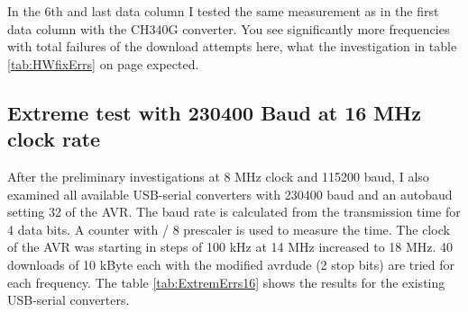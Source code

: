 In the 6th and last data column I tested the same measurement as in the first data column with the CH340G converter.
You see significantly more frequencies with total failures of the download attempts here,
what the investigation in table \ref{tab:HWfixErrs} on page \pageref{tab:HWfixErrs} expected.

\subsection{Extreme test with 230400 Baud at 16 MHz clock rate}

After the preliminary investigations at 8 MHz clock and 115200 baud, I also examined all
available USB-serial converters with 230400 baud and an autobaud setting 32 of the AVR.
The baud rate is calculated from the transmission time for 4 data bits.
A counter with / 8 prescaler is used to measure the time.
The clock of the AVR was starting in steps of 100 kHz
at 14 MHz increased to 18 MHz.
40 downloads of 10 kByte each with the modified avrdude (2 stop bits) are tried for each frequency.
The table \ref{tab:ExtremErrs16} shows the results for the existing USB-serial converters.

